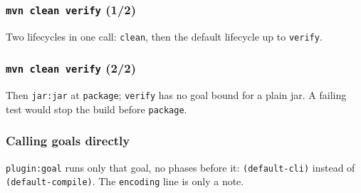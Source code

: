 \documentclass[aspectratio=169,10pt,compress]{beamer}
\begin{document}
\begin{frame}[t,fragile] \frametitle{\texttt{mvn clean verify} (1/2)}

  \vspace{0.1em}
  \small Two lifecycles in one call: \texttt{clean}, then the default lifecycle up to \texttt{verify}.
\end{frame}




\begin{frame}[t,fragile] \frametitle{\texttt{mvn clean verify} (2/2)}

  \vspace{0.1em}
  \small Then \texttt{jar:jar} at \texttt{package}; \texttt{verify} has no goal bound for a plain jar. A failing test would stop the build before \texttt{package}.
\end{frame}




\begin{frame}[t,fragile] \frametitle{Calling goals directly}

  \vspace{0.1em}
  \small
  \texttt{plugin:goal} runs only that goal, no phases before it: \texttt{(default-cli)} instead of \texttt{(default-compile)}. The \texttt{encoding} line is only a note.
\end{frame}

\end{document}
